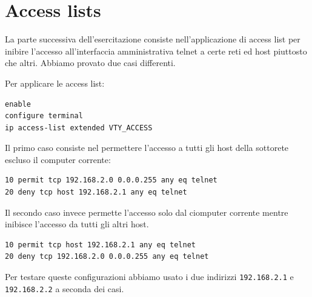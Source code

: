 \documentclass[9pt, a4paper, oneside]{article}
\begin{document}
		\section{Access lists}
			\par
				La parte successiva dell'esercitazione consiste 
				nell'applicazione di access list per inibire 
				l'accesso all'interfaccia amministrativa telnet 
				a certe reti ed host piuttosto che altri.
				Abbiamo provato due casi differenti.
			\par
				Per applicare le access list:
				\begin{verbatim}
enable
configure terminal
ip access-list extended VTY_ACCESS
				\end{verbatim}
			\par
				Il primo caso consiste nel permettere l'accesso 
				a tutti gli host della sottorete escluso il 
				computer corrente:
				\begin{verbatim}
10 permit tcp 192.168.2.0 0.0.0.255 any eq telnet
20 deny tcp host 192.168.2.1 any eq telnet
				\end{verbatim}
			\par
				Il secondo caso invece permette l'accesso solo 
				dal ciomputer corrente mentre inibisce 
				l'accesso da tutti gli altri host.
				\begin{verbatim}
10 permit tcp host 192.168.2.1 any eq telnet
20 deny tcp 192.168.2.0 0.0.0.255 any eq telnet
				\end{verbatim}
			\par
				Per testare queste configurazioni abbiamo 
				usato i due indirizzi \texttt{192.168.2.1} e 
				\texttt{192.168.2.2} a seconda dei casi.
\end{document}
